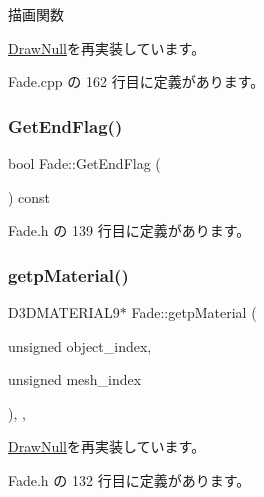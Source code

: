 描画関数 



\mbox{\hyperlink{class_draw_null_afe50f6fd820b18d673f70f048743f339}{Draw\+Null}}を再実装しています。



 Fade.\+cpp の 162 行目に定義があります。

\mbox{\label{class_fade_acc8adf28ce2e4270e5fb3907d83dadd0}} 
\subsubsection{\texorpdfstring{Get\+End\+Flag()}{GetEndFlag()}}
{\footnotesize\ttfamily bool Fade\+::\+Get\+End\+Flag (\begin{DoxyParamCaption}{ }\end{DoxyParamCaption}) const\hspace{0.3cm}{\ttfamily [inline]}}



 Fade.\+h の 139 行目に定義があります。

\mbox{\label{class_fade_a69db8b97a493082644fbd82c9ef3d1aa}} 
\subsubsection{\texorpdfstring{getp\+Material()}{getpMaterial()}}
{\footnotesize\ttfamily D3\+D\+M\+A\+T\+E\+R\+I\+A\+L9$\ast$ Fade\+::getp\+Material (\begin{DoxyParamCaption}\item[{unsigned}]{object\+\_\+index,  }\item[{unsigned}]{mesh\+\_\+index }\end{DoxyParamCaption})\hspace{0.3cm}{\ttfamily [inline]}, {\ttfamily [override]}, {\ttfamily [virtual]}}



\mbox{\hyperlink{class_draw_null_aa07d7e89e723b68ec257da0f63d43f70}{Draw\+Null}}を再実装しています。



 Fade.\+h の 132 行目に定義があります。

\mbox{\label{class_fade_a2e41a31f9801476e63d2082804375e96}} 
